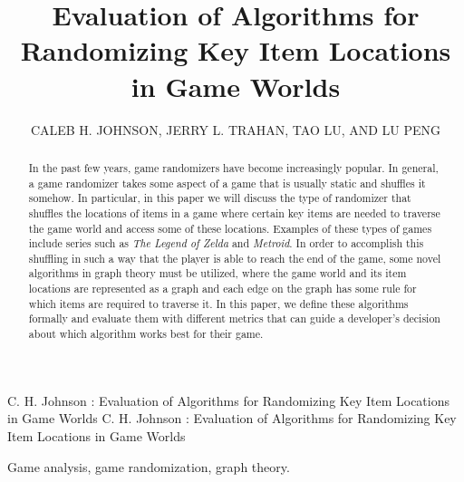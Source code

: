 \documentclass{ieeeaccess}
\begin{document}

\title{Evaluation of Algorithms for Randomizing Key Item Locations in Game Worlds}
\author{\uppercase{Caleb H. Johnson}, 
\uppercase{Jerry L. Trahan, Tao Lu, and Lu Peng}
}
\address{Division of Electrical and Computer Engineering, 
Louisiana State University, Baton Rouge, LA 70803, USA}

\markboth
{C. H. Johnson \headeretal: Evaluation of Algorithms for Randomizing Key Item Locations in Game Worlds}
{C. H. Johnson \headeretal: Evaluation of Algorithms for Randomizing Key Item Locations in Game Worlds}


\begin{abstract}
In the past few years, game randomizers have become increasingly popular. In general, a game
randomizer takes some aspect of a game that is usually static and shuffles it somehow. In
particular, in this paper we will discuss the type of randomizer that shuffles the locations of
items in a game where certain key items are needed to traverse the game world and access some of
these locations. Examples of these types of games include series such as \textit{The
Legend of Zelda} and \textit{Metroid}. In order to accomplish this shuffling in such a way that
the player is able to reach the end of the game, some novel algorithms in graph theory must be
utilized, where the game world and its item locations are represented as a graph and each edge
on the graph has some rule for which items are required to traverse it. In this paper, we define
these algorithms formally and evaluate them with different metrics that can guide a developer’s
decision about which algorithm works best for their game.
\end{abstract}

\begin{keywords}
Game analysis, game randomization, graph theory.
\end{keywords}

\titlepgskip=-15pt

\maketitle
\end{document}
